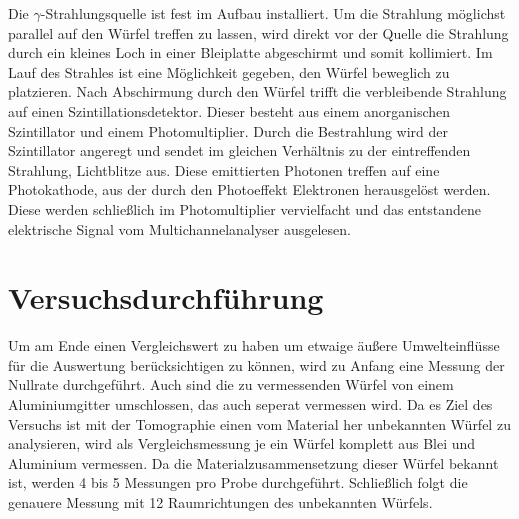 Die $\gamma$-Strahlungsquelle ist fest im Aufbau installiert. Um die Strahlung möglichst parallel auf den Würfel treffen zu lassen, wird direkt vor der Quelle die Strahlung durch ein
kleines Loch in einer Bleiplatte abgeschirmt und somit kollimiert.
Im Lauf des Strahles ist eine Möglichkeit gegeben, den Würfel beweglich zu platzieren.
Nach Abschirmung durch den Würfel trifft die verbleibende Strahlung auf einen Szintillationsdetektor.
Dieser besteht aus einem anorganischen Szintillator und einem Photomultiplier.
Durch die Bestrahlung wird der Szintillator angeregt und sendet im gleichen Verhältnis zu der eintreffenden Strahlung, Lichtblitze aus.
Diese emittierten Photonen treffen auf eine Photokathode, aus der durch den Photoeffekt Elektronen herausgelöst werden.
Diese werden schließlich im Photomultiplier vervielfacht und das entstandene elektrische Signal vom Multichannelanalyser ausgelesen.

\section{Versuchsdurchführung}
Um am Ende einen Vergleichswert zu haben um etwaige äußere Umwelteinflüsse für die Auswertung berücksichtigen zu können, wird
zu Anfang eine Messung der Nullrate durchgeführt.
Auch sind die zu vermessenden Würfel von einem Aluminiumgitter umschlossen, das auch seperat vermessen wird.
Da es Ziel des Versuchs ist mit der Tomographie einen vom Material her unbekannten Würfel zu analysieren, wird
als Vergleichsmessung je ein Würfel komplett aus Blei und Aluminium vermessen.
Da die Materialzusammensetzung dieser Würfel bekannt ist, werden 4 bis 5 Messungen pro Probe durchgeführt.
Schließlich folgt die genauere Messung mit 12 Raumrichtungen des unbekannten Würfels.
